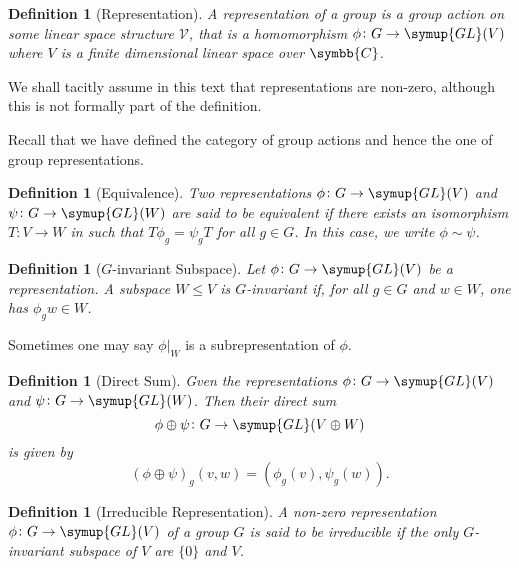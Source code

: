 \documentclass{assignment}[2019/10/15]
\theoremstyle{plain}
\newtheorem{definition}[theorem]{Definition}
\newcommand{\BC}{\symbb{C}}
\newcommand{\GL}{\mathop{}\!\symup{GL}}
\begin{document}
    \begin{definition}[Representation]
        A \emph{representation} of a group is a group action on some linear space structure $\mathcal{V}$, that is a homomorphism $\phi\colon G\to\GL(V)$ where $V$ is a finite dimensional linear space over $\BC$.
    \end{definition}

    We shall tacitly assume in this text that representations are non-zero, although this is not formally part of the definition.

    Recall that we have defined the category of group actions and hence the one of group representations.

    \begin{definition}[Equivalence]
        Two representations $\phi\colon G\to \GL(V)$ and $\psi\colon G\to\GL(W)$ are said to be equivalent if there exists an isomorphism $T\colon V\to W$ in such that $T\phi_g = \psi_gT$ for all $g\in G$. In this case, we write $\phi\sim\psi$.
    \end{definition}

    \begin{definition}[$G$-invariant Subspace]
        Let $\phi\colon G\to \GL(V)$ be a representation. A subspace $W\leq V$ is $G$-\emph{invariant} if, for all $g\in G$ and $w\in W$, one has $\phi_gw\in W$.
    \end{definition}

    Sometimes one may say $\phi|_W$ is a subrepresentation of $\phi$.

    \begin{definition}[Direct Sum]
        Gven the representations $\phi\colon G\to \GL(V)$ and $\psi\colon G\to\GL(W)$. Then their \emph{direct sum}
        \begin{equation}
            \phi\oplus\psi\colon G\to\GL(V\oplus W)
        \end{equation}
        is given by
        \begin{equation}
            (\phi\oplus\psi)_g(v, w) = (\phi_g(v), \psi_g(w)).
        \end{equation}
    \end{definition}

    \begin{definition}[Irreducible Representation]
        A non-zero representation $\phi\colon G\to \GL(V)$ of a group $G$ is said to be \emph{irreducible} if the only $G$-invariant subspace of $V$ are $\{0\}$ and $V$.
    \end{definition}
\end{document}
